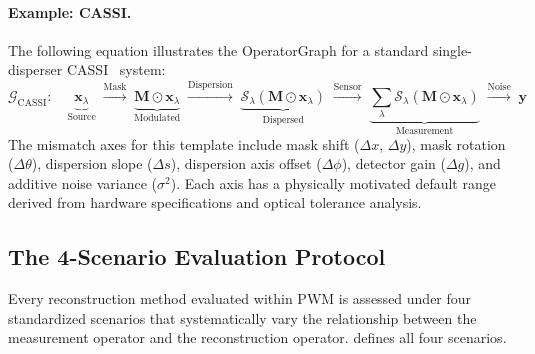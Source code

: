 \paragraph{Example: CASSI.}
The following equation illustrates the OperatorGraph for a standard
single-disperser CASSI~\cite{wagadarikar2008cassi} system:
\begin{equation}
  \mathcal{G}_{\text{CASSI}}:
  \quad
  \underbrace{\mathbf{x}_\lambda}_{\text{Source}}
  \;\xrightarrow{\text{Mask}}\;
  \underbrace{\mathbf{M} \odot \mathbf{x}_\lambda}_{\text{Modulated}}
  \;\xrightarrow{\text{Dispersion}}\;
  \underbrace{\mathcal{S}_\lambda(\mathbf{M} \odot
  \mathbf{x}_\lambda)}_{\text{Dispersed}}
  \;\xrightarrow{\text{Sensor}}\;
  \underbrace{\textstyle\sum_\lambda
  \mathcal{S}_\lambda(\mathbf{M} \odot
  \mathbf{x}_\lambda)}_{\text{Measurement}}
  \;\xrightarrow{\text{Noise}}\;
  \mathbf{y}
\end{equation}
The mismatch axes for this template include mask shift
($\Delta x$, $\Delta y$), mask rotation ($\Delta\theta$), dispersion
slope ($\Delta s$), dispersion axis offset ($\Delta\phi$), detector
gain ($\Delta g$), and additive noise variance ($\sigma^2$).
Each axis has a physically motivated default range derived from
hardware specifications and optical tolerance analysis.


\subsection{The 4-Scenario Evaluation Protocol}
\label{sec:scenarios}

Every reconstruction method evaluated within PWM is assessed under four
standardized scenarios that systematically vary the relationship between
the measurement operator and the reconstruction operator.
 defines all four scenarios.


